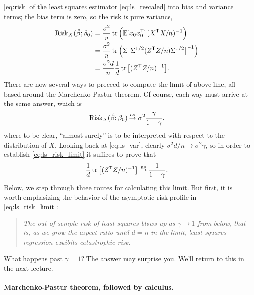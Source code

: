 \documentclass{article}
\begin{document}
\eqref{eq:risk} of the least squares estimator \eqref{eq:ls_rescaled} into bias
and variance terms; the bias term is zero, so the risk is pure variance,      
\begin{align}
\nonumber
\mathrm{Risk}_X(\hat{\beta}; \beta_0) 
&= \frac{\sigma^2}{n} \operatorname{tr}\Big(\mathbb{E} [x_0 x_0^{\mathsf{T}}] \, (X^{\mathsf{T}} X/n)^{-1} \Big) \\
\nonumber
&= \frac{\sigma^2}{n}\operatorname{tr}\Big(\Sigma \big[ \Sigma^{1/2} (Z^{\mathsf{T}} Z/n) \Sigma^{1/2} 
  \big]^{-1} \Big) \\ 
\label{eq:ls_var}
&= \frac{\sigma^2 d}{n} \frac{1}{d} \operatorname{tr} \big[ (Z^{\mathsf{T}} Z/n)^{-1} \big].
\end{align}
There are now several ways to proceed to compute the limit of above line, all
based around the Marchenko-Pastur theorem. Of course, each way must arrive at
the same answer, which is
\begin{equation}
\label{eq:ls_risk_limit}
\mathrm{Risk}_X(\hat{\beta}; \beta_0) \overset{\mathrm{as}}{\to} \sigma^2 \frac{\gamma}{1-\gamma},
\end{equation}
where to be clear, ``almost surely'' is to be interpreted with respect to the
distribution of $X$. Looking back at \eqref{eq:ls_var}, clearly $\sigma^2 d/n
\to \sigma^2 \gamma$, so in order to establish \eqref{eq:ls_risk_limit} it
suffices to prove that   
\begin{equation}
\label{eq:ls_var_limit}
\frac{1}{d} \operatorname{tr} \big[ (Z^{\mathsf{T}} Z/n)^{-1} \big] \overset{\mathrm{as}}{\to} \frac{1}{1-\gamma}.
\end{equation}
Below, we step through three routes for calculating this limit. But first, it is
worth emphasizing the behavior of the asymptotic risk profile in
\eqref{eq:ls_risk_limit}:  
\begin{quote}
\centering\it
The out-of-sample risk of least squares blows up as $\gamma \to 1$ from below,
that is, as we grow the aspect ratio until $d = n$ in the limit, least squares
regression exhibits catastrophic risk.  
\end{quote}
What happens past $\gamma = 1$? The answer may surprise you. We'll return to
this in the next lecture.  

\paragraph{Marchenko-Pastur theorem, followed by calculus.}  
\end{document}
